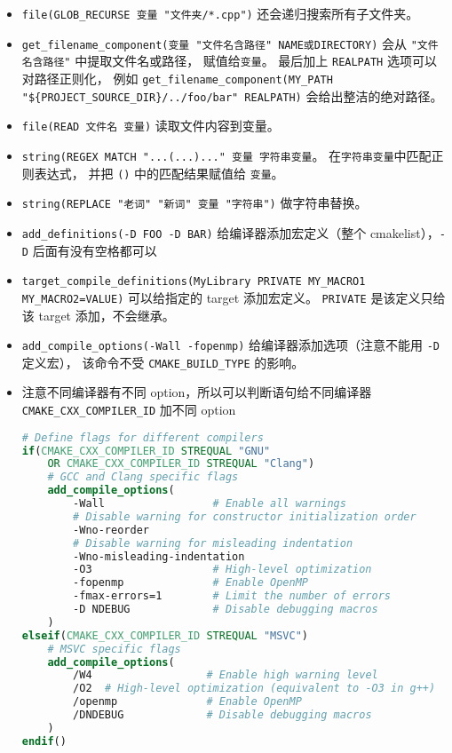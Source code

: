 \begin{itemize}
\item \verb`file(GLOB_RECURSE 变量 "文件夹/*.cpp")` 还会递归搜索所有子文件夹。
\item \verb`get_filename_component(变量 "文件名含路径" NAME或DIRECTORY)` 会从 \verb`"文件名含路径"` 中提取文件名或路径， 赋值给\verb`变量`。 最后加上 \verb`REALPATH` 选项可以对路径正则化， 例如 \verb`get_filename_component(MY_PATH "${PROJECT_SOURCE_DIR}/../foo/bar" REALPATH)` 会给出整洁的绝对路径。
\item \verb`file(READ 文件名 变量)` 读取文件内容到变量。
\item \verb`string(REGEX MATCH "...(...)..." 变量 字符串变量`。 在\verb`字符串变量`中匹配正则表达式， 并把 \verb`()` 中的匹配结果赋值给 \verb`变量`。
\item \verb`string(REPLACE "老词" "新词" 变量 "字符串")` 做字符串替换。
\item \verb`add_definitions(-D FOO -D BAR)` 给编译器添加宏定义（整个 cmakelist），\verb`-D` 后面有没有空格都可以
\item \verb`target_compile_definitions(MyLibrary PRIVATE MY_MACRO1 MY_MACRO2=VALUE)` 可以给指定的 target 添加宏定义。 \verb`PRIVATE` 是该定义只给该 target 添加，不会继承。
\item \verb`add_compile_options(-Wall -fopenmp)` 给编译器添加选项（注意不能用 \verb`-D` 定义宏）， 该命令不受 \verb`CMAKE_BUILD_TYPE` 的影响。
\item 注意不同编译器有不同 option，所以可以判断语句给不同编译器 \verb`CMAKE_CXX_COMPILER_ID` 加不同 option
\begin{lstlisting}[language=cmake]
# Define flags for different compilers
if(CMAKE_CXX_COMPILER_ID STREQUAL "GNU"
    OR CMAKE_CXX_COMPILER_ID STREQUAL "Clang")
    # GCC and Clang specific flags
    add_compile_options(
        -Wall                 # Enable all warnings
        # Disable warning for constructor initialization order
        -Wno-reorder
        # Disable warning for misleading indentation
        -Wno-misleading-indentation
        -O3                   # High-level optimization
        -fopenmp              # Enable OpenMP
        -fmax-errors=1        # Limit the number of errors
        -D NDEBUG             # Disable debugging macros
    )
elseif(CMAKE_CXX_COMPILER_ID STREQUAL "MSVC")
    # MSVC specific flags
    add_compile_options(
        /W4                  # Enable high warning level
        /O2  # High-level optimization (equivalent to -O3 in g++)
        /openmp              # Enable OpenMP
        /DNDEBUG             # Disable debugging macros
    )
endif()
\end{lstlisting}

\end{itemize}
